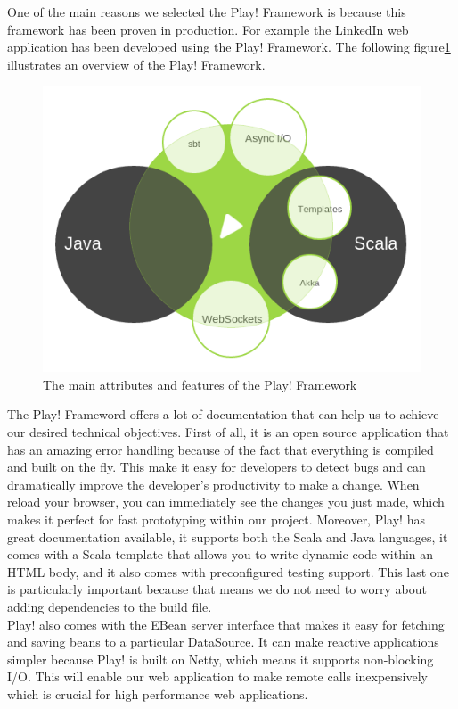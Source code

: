 One of the main reasons we selected the Play! Framework is because this framework has been proven in production. For example the LinkedIn web application has been developed using the Play! Framework. The following figure\ref{play} illustrates an overview of the Play! Framework.\\

\begin{figure}[h]
\centering
\includegraphics[scale=0.5]{./img/play.png}
\caption{\small{The main attributes and features of the Play! Framework}}
\label{play}
\end{figure}
 
 
The Play! Frameword offers a lot of documentation\cite{playDoc} that can help us to achieve our desired technical objectives. First of all, it is an open source application that has an amazing error handling because of the fact that everything is compiled and built on the fly. This make it easy for developers to detect bugs and can dramatically improve the developer's productivity to make a change. When reload your browser, you can immediately see the changes you just made, which makes it perfect for fast prototyping within our project. Moreover, Play! has great documentation available, it supports both the Scala and Java languages, it comes with a Scala template that allows you to write dynamic code within an HTML body, and it also comes with preconfigured testing support. This last one is particularly important because that means we do not need to worry about adding dependencies to the build file. \\
Play! also comes with the EBean server interface that makes it easy for fetching and saving beans to a particular DataSource. It can make reactive applications simpler because Play! is built on Netty, which means it supports non-blocking I/O. This will enable our web application to make remote calls inexpensively which is crucial for high performance web applications.






